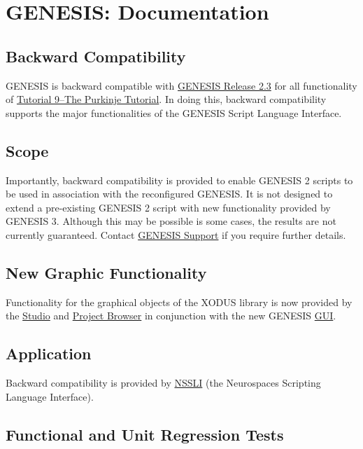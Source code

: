\documentclass[12pt]{article}
\begin{document}
\section*{GENESIS: Documentation}

\subsection*{Backward Compatibility}

GENESIS is backward compatible with \href{http://genesis-sim.org/GENESIS/genesis-ftp/}{GENESIS Release 2.3} for all functionality of \href{http://genesis-sim.org/GENESIS/illtuts/purkinje.html}{Tutorial 9--The Purkinje Tutorial}. In doing this, backward compatibility supports the major functionalities of the GENESIS Script Language Interface.

\subsection*{Scope}

Importantly, backward compatibility is provided to enable GENESIS 2 scripts to be used in association with the reconfigured GENESIS. It is not designed to extend a pre-existing GENESIS 2 script with new functionality provided by GENESIS 3. Although this may be possible is some cases, the results are not currently guaranteed. Contact \href{http://genesis-sim.org/contact}{GENESIS Support} if you require further details.

\subsection*{New Graphic Functionality}

Functionality for the graphical objects of the XODUS library is now provided by the \href{../studio/studio.tex}{Studio} and \href{../project-browser/project-browser.tex}{Project Browser} in conjunction with the new GENESIS \href{../gui/gui.tex}{GUI}.

\subsection*{Application}

Backward compatibility is provided by \href{../nssli/nssli.tex}{NSSLI} (the Neurospaces Scripting Language Interface).

\subsection*{Functional and Unit Regression Tests}
\end{document}

